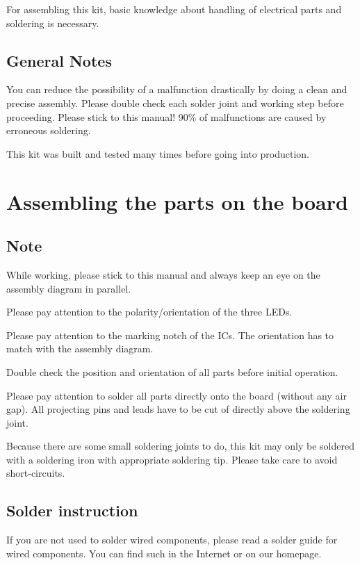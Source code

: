 \documentclass[fleqn,10pt]{SelfArx} %
\begin{document}
For assembling this kit, basic knowledge about handling of electrical parts and soldering is necessary.

 \subsection*{General Notes}

You can reduce the possibility of a malfunction drastically by doing a clean and precise assembly. Please double check each solder joint and working step before proceeding. Please stick to this manual!
90\% of malfunctions are caused by erroneous soldering.

This kit was built and tested many times before going into production.


\section{Assembling the parts on the board}

 \subsection*{Note}

While working, please stick to this manual and always keep an eye on the assembly diagram in parallel.

Please pay attention to the polarity/orientation of the three LEDs.

Please pay attention to the marking notch of the ICs. The orientation has to match with the assembly diagram.

Double check the position and orientation of all parts before initial operation.

Please pay attention to solder all parts directly onto the board (without any air gap). All projecting pins and leads have to be cut of directly above the soldering joint.

Because there are some small soldering joints to do, this kit may only be soldered with a soldering iron with appropriate soldering tip. Please take care to avoid short-circuits.

 \subsection*{Solder instruction}

If you are not used to solder wired components, please read a solder guide for wired components. You can find such in the Internet or on our homepage.
\end{document}
